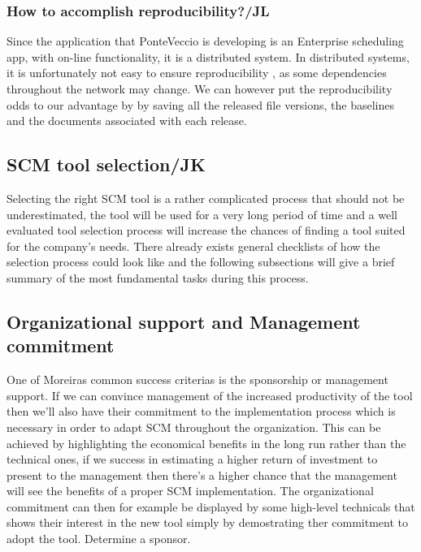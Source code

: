 \documentclass[10pt]{article}
\begin{document}
\subsubsection{How to accomplish reproducibility?/JL}
\noindent Since the application that PonteVeccio is developing is an Enterprise scheduling app, with on-line functionality, it is a distributed system. In distributed systems, it is unfortunately not easy to ensure reproducibility \cite{Bays}, as some dependencies throughout the network may change. We can however put the reproducibility odds to our advantage by by saving all the released file versions, the baselines and the documents associated with each release. 

\subsection{SCM tool selection/JK}
Selecting the right SCM tool is a rather complicated process that should not be underestimated, the tool will be used for a very long period of time and a well evaluated tool selection process will increase the chances of finding a tool suited for the company's needs. There already exists general checklists of how the selection process could look like and the following subsections will give a brief summary of the most fundamental tasks during this process.

\subsection{Organizational support and Management commitment}
One of Moreiras \cite{Moreira} common success criterias is the sponsorship or management support.
If we can convince management of the increased productivity of the tool then we'll also have their commitment to the implementation process which is necessary in order to adapt SCM throughout the organization. This can be achieved by highlighting the economical benefits in the long run rather than the technical ones, if we success in estimating a higher return of investment to present to the management then there's a higher chance that the management will see the benefits of a proper SCM implementation. The organizational commitment can then for example be displayed by some high-level technicals that shows their interest in the new tool simply by demostrating ther commitment to adopt the tool.  Determine a sponsor.
\end{document}
